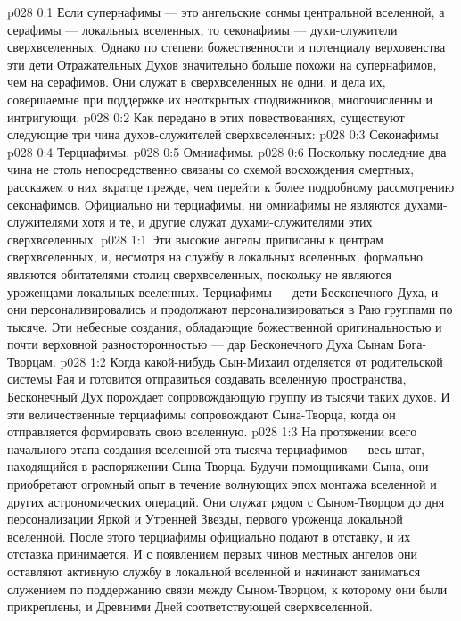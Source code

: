 \author{Могучий Вестник}
\vs p028 0:1 Если супернафимы --- это ангельские сонмы центральной вселенной, а серафимы --- локальных вселенных, то секонафимы --- духи\hyp{}служители сверхвселенных. Однако по степени божественности и потенциалу верховенства эти дети Отражательных Духов значительно больше похожи на супернафимов, чем на серафимов. Они служат в сверхвселенных не одни, и дела их, совершаемые при поддержке их неоткрытых сподвижников, многочисленны и интригующи.
\vs p028 0:2 \pc Как передано в этих повествованиях, существуют следующие три чина духов\hyp{}служителей сверхвселенных:
\vs p028 0:3 \bibnobreakspace Секонафимы.
\vs p028 0:4 \bibnobreakspace Терциафимы.
\vs p028 0:5 \bibnobreakspace Омниафимы.
\vs p028 0:6 \pc Поскольку последние два чина не столь непосредственно связаны со схемой восхождения смертных, расскажем о них вкратце прежде, чем перейти к более подробному рассмотрению секонафимов. Официально ни терциафимы, ни омниафимы не являются духами\hyp{}служителями  хотя и те, и другие служат духами\hyp{}служителями  этих сверхвселенных.
\vs p028 1:1 Эти высокие ангелы приписаны к центрам сверхвселенных, и, несмотря на службу в локальных вселенных, формально являются обитателями столиц сверхвселенных, поскольку не являются уроженцами локальных вселенных. Терциафимы --- дети Бесконечного Духа, и они персонализировались и продолжают персонализироваться в Раю группами по тысяче. Эти небесные создания, обладающие божественной оригинальностью и почти верховной разносторонностью --- дар Бесконечного Духа Сынам Бога\hyp{}Творцам.
\vs p028 1:2 Когда какой\hyp{}нибудь Сын\hyp{}Михаил отделяется от родительской системы Рая и готовится отправиться создавать вселенную пространства, Бесконечный Дух порождает сопровождающую группу из тысячи таких духов. И эти величественные терциафимы сопровождают Сына\hyp{}Творца, когда он отправляется формировать свою вселенную.
\vs p028 1:3 На протяжении всего начального этапа создания вселенной эта тысяча терциафимов --- весь штат, находящийся в распоряжении Сына\hyp{}Творца. Будучи помощниками Сына, они приобретают огромный опыт в течение волнующих эпох монтажа вселенной и других астрономических операций. Они служат рядом с Сыном\hyp{}Творцом до дня персонализации Яркой и Утренней Звезды, первого уроженца локальной вселенной. После этого терциафимы официально подают в отставку, и их отставка принимается. И с появлением первых чинов местных ангелов они оставляют активную службу в локальной вселенной и начинают заниматься служением по поддержанию связи между Сыном\hyp{}Творцом, к которому они были прикреплены, и Древними Дней соответствующей сверхвселенной.
